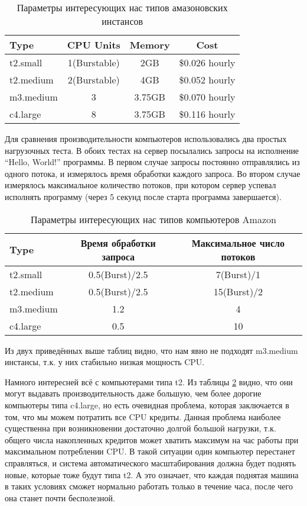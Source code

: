 \begin{table}[h]
	\centering
	\begin{tabular}{l|c|c|c}
		Type      & CPU Units    & Memory & Cost\\ \hline
		t2.small  & 1(Burstable) & 2GB    & \$0.026 hourly\\ \hline
		t2.medium & 2(Burstable) & 4GB    & \$0.052 hourly\\ \hline
		m3.medium & 3            & 3.75GB & \$0.070 hourly\\ \hline
		c4.large  & 8            & 3.75GB & \$0.116 hourly\\
	\end{tabular}
	\caption{Параметры интересующих нас типов амазоновских инстансов}
	\label{table:instance_types}
\end{table}
	
	Для сравнения производительности компьютеров использовались два простых нагрузочных теста. В обоих тестах на сервер посылались запросы на исполнение ``Hello, World!'' программы. В первом случае запросы постоянно отправлялись из одного потока, и измерялось время обработки каждого запроса. Во втором случае измерялось максимальное количество потоков, при котором сервер успевал исполнять программу (через 5 секунд после старта программа завершается).
	
\begin{table}[h]
	\centering
	\begin{tabular}{l|c|c}
		Type      & Время обработки запроса    & Максимальное число потоков\\ \hline
		t2.small  & 0.5(Burst)/2.5             & 7(Burst)/1  \\ \hline
		t2.medium & 0.5(Burst)/2.5             & 15(Burst)/2 \\ \hline
		m3.medium & 1.2                        & 4           \\ \hline
		c4.large  & 0.5                        & 10          \\
	\end{tabular}
	\caption{Параметры интересующих нас типов компьютеров Amazon}
	\label{table:instance_types_performance}
\end{table}

	Из двух приведённых выше таблиц видно, что нам явно не подходят m3.medium инстансы, т.к. у них стабильно низкая мощность CPU.
	
	Намного интересней всё с компьютерами типа t2. Из таблицы \ref{table:instance_types_performance}	 видно, что они могут выдавать производительность даже большую, чем более дорогие компьютеры типа c4.large, но есть очевидная проблема, которая заключается в том, что мы можем потратить все CPU кредиты. Данная проблема наиболее существенна при возникновении достаточно долгой большой нагрузки, т.к. общего числа накопленных кредитов может хватить максимум на час работы при максимальном потреблении CPU. В такой ситуации один компьютер перестанет справляться, и система автоматического масштабирования должна будет поднять новые, которые тоже будут типа t2. А это означает, что каждая поднятая машина в таких условиях сможет нормально работать только в течение часа, после чего она станет почти бесполезной. 
	
